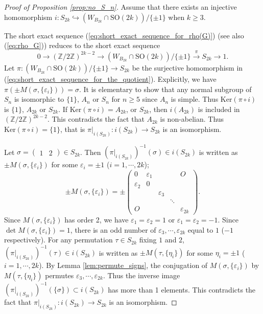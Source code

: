 \documentclass[10pt,a4paper]{amsart}
\begin{document}
\begin{proof}[Proof of Proposition \ref{prop:no_S_n}]
Assume that there exists an injective homomorphism 
$i : S_{2k} \hookrightarrow (W_{B_{2k}} \cap \mathrm{SO}(2k))  / \{ \pm 1 \}$ 
when $k \geq 3$.

The short exact sequence (\ref{eq:short_exact_sequence_for_rho(G)}) 
(see also (\ref{eq:rho_G})) reduces to the short exact sequence
\begin{equation}
\label{eq:short_exact_sequence_for_the_quotient}
0 \to (\mathbb{Z} / 2 \mathbb{Z})^{2k-2} \to 
(W_{B_{2k}} \cap \mathrm{SO}(2k))/\{ \pm 1 \} \xrightarrow[]{\pi} S_{2k} \to 1.
\end{equation}
Let $\pi : (W_{B_{2k}} \cap \mathrm{SO}(2k))  / \{ \pm 1 \} \to S_{2k}$ be the
surjective homomorphism in (\ref{eq:short_exact_sequence_for_the_quotient}).
Explicitly, we have $\pi( \pm M(\sigma, \{ \varepsilon_i \})) = \sigma$.
It is elementary to show that any normal subgroup of $S_n$ is isomorphic to 
$\{1\}$, $A_n$ or $S_n$ for $n \geq 5$ since $A_n$ is simple.
Thus $\mathrm{Ker} (\pi \circ i)$ is $\{1\}$, $A_{2k}$ or $S_{2k}$.
If $\mathrm{Ker} (\pi \circ i) = A_{2k}$, or $S_{2k}$, 
then $i(A_{2k})$ is included in $(\mathbb{Z} / 2 \mathbb{Z})^{2k-2}$.
This contradicts the fact that $A_{2k}$ is non-abelian.
Thus $\mathrm{Ker} (\pi \circ i) = \{ 1 \}$, 
that is $\pi |_{i(S_{2k})} : i(S_{2k}) \to S_{2k}$ is an isomorphism.

Let $\sigma = \begin{pmatrix} 1 & 2 \end{pmatrix} \in S_{2k}$.
Then $(\pi |_{i(S_{2k})})^{-1} ( \sigma ) \in i (S_{2k})$ is  written as 
$\pm M(\sigma, \{ \varepsilon_i \})$ 
for some $\varepsilon_i = \pm 1$ ($i = 1, \cdots , 2k$);
\[
\pm M(\sigma, \{ \varepsilon_i \}) 
= \pm
\begin{pmatrix} 
0 & \varepsilon_1 & & & O \\
\varepsilon_2 & 0 & & &  \\
& & \varepsilon_{3}& & \\
& & & \ddots \\
O & & & &\varepsilon_{2k}
\end{pmatrix}.
\]
Since $M(\sigma, \{ \varepsilon_i \})$ has order 2, 
we have $\varepsilon_1 = \varepsilon_2 = 1$ or $\varepsilon_1 = \varepsilon_2 = -1$. 
Since $\det M(\sigma, \{ \varepsilon_i \}) = 1$, 
there is an odd number of $\varepsilon_3, \cdots , \varepsilon_{2k}$ equal to $1$
($-1$ respectively).
For any permutation $\tau \in S_{2k}$ fixing $1$ and $2$, 
$(\pi |_{i(S_{2k})})^{-1} ( \tau ) \in i (S_{2k})$ is  written as 
$\pm M(\tau, \{ \eta_i \})$ 
for some $\eta_i = \pm 1$ ($i = 1, \cdots , 2k$).
By Lemma \ref{lem:permute_signs}, 
the conjugation of $M(\sigma, \{ \varepsilon_i \})$ by $M(\tau, \{ \eta_i \})$ 
permutes $\varepsilon_3, \cdots , \varepsilon_{2k}$.
Thus the inverse image $(\pi |_{i(S_{2k})})^{-1} ( \{ \sigma \} ) \subset  i (S_{2k})$
has more than 1 elements. 
This contradicts the fact that 
$\pi |_{i(S_{2k})} : i(S_{2k}) \to S_{2k}$ is an isomorphism.
\end{proof}
\end{document}
